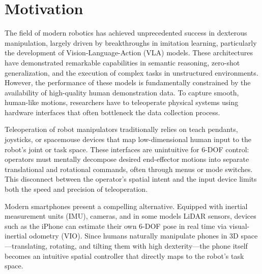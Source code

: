 \section{Motivation}

The field of modern robotics has achieved unprecedented success in dexterous manipulation, largely driven by breakthroughs in imitation learning, particularly the development of Vision-Language-Action (VLA) models. These architectures have demonstrated remarkable capabilities in semantic reasoning, zero-shot generalization, and the execution of complex tasks in unstructured environments. However, the performance of these models is fundamentally constrained by the availability of high-quality human demonstration data. To capture smooth, human-like motions, researchers have to teleoperate physical systems using hardware interfaces that often bottleneck the data collection process.

Teleoperation of robot manipulators traditionally relies on teach pendants, joysticks, or spacemouse devices that map low-dimensional human input to the robot's joint or task space. These interfaces are unintuitive for 6-DOF control: operators must mentally decompose desired end-effector motions into separate translational and rotational commands, often through menus or mode switches. This disconnect between the operator's spatial intent and the input device limits both the speed and precision of teleoperation.

Modern smartphones present a compelling alternative. Equipped with inertial measurement units (IMU), cameras, and in some models LiDAR sensors, devices such as the iPhone can estimate their own 6-DOF pose in real time via visual-inertial odometry (VIO). Since humans naturally manipulate phones in 3D space---translating, rotating, and tilting them with high dexterity---the phone itself becomes an intuitive spatial controller that directly maps to the robot's task space.